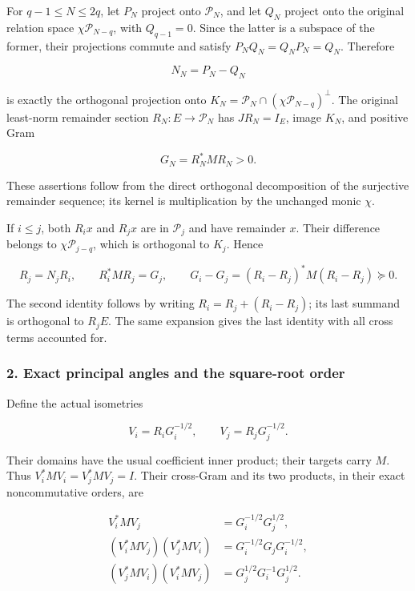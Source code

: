 For \(q-1\le N\le2q\), let \(P_N\) project onto \(\mathcal P_N\), and let \(Q_N\) project onto the original relation space \(\chi\mathcal P_{N-q}\), with \(Q_{q-1}=0\). Since the latter is a subspace of the former, their projections commute and satisfy \(P_NQ_N=Q_NP_N=Q_N\). Therefore

\[
N_N=P_N-Q_N
\tag{PA2}
\]

is exactly the orthogonal projection onto \(K_N=\mathcal P_N\cap(\chi\mathcal P_{N-q})^\perp\). The original least-norm remainder section \(R_N:E\to\mathcal P_N\) has \(JR_N=I_E\), image \(K_N\), and positive Gram

\[
G_N=R_N^*MR_N>0.
\tag{PA3}
\]

These assertions follow from the direct orthogonal decomposition of the surjective remainder sequence; its kernel is multiplication by the unchanged monic \(\chi\).

If \(i\le j\), both \(R_i x\) and \(R_jx\) are in \(\mathcal P_j\) and have remainder \(x\). Their difference belongs to \(\chi\mathcal P_{j-q}\), which is orthogonal to \(K_j\). Hence

\[
\boxed{R_j=N_jR_i},\qquad
R_i^*MR_j=G_j,
\qquad
G_i-G_j=(R_i-R_j)^*M(R_i-R_j)\succeq0.
\tag{PA4}
\]

The second identity follows by writing \(R_i=R_j+(R_i-R_j)\); its last summand is orthogonal to \(R_jE\). The same expansion gives the last identity with all cross terms accounted for.

\subsubsection{2. Exact principal angles and the square-root order}\label{endpoint-principal_angle_volume_review--exact-principal-angles-and-the-square-root-order}

Define the actual isometries

\[
V_i=R_iG_i^{-1/2},\qquad V_j=R_jG_j^{-1/2}.
\tag{PA5}
\]

Their domains have the usual coefficient inner product; their targets carry \(M\). Thus \(V_i^*MV_i=V_j^*MV_j=I\). Their cross-Gram and its two products, in their exact noncommutative orders, are

\[
\begin{aligned}
V_i^*MV_j&=G_i^{-1/2}G_j^{1/2},\\
(V_i^*MV_j)(V_j^*MV_i)
&=G_i^{-1/2}G_jG_i^{-1/2},\\
(V_j^*MV_i)(V_i^*MV_j)
&=G_j^{1/2}G_i^{-1}G_j^{1/2}.
\end{aligned}
\tag{PA6}
\]

